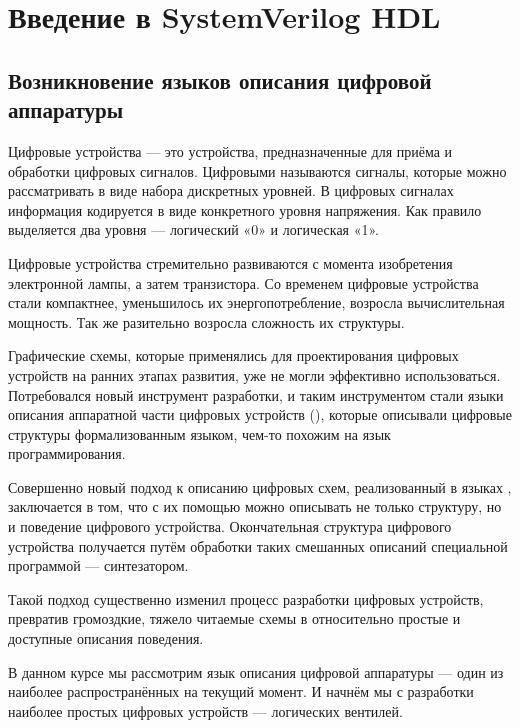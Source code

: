 \chapter{Введение в SystemVerilog HDL} 
\section{Возникновение языков описания цифровой аппаратуры}

\par{Цифровые устройства — это устройства, предназначенные для приёма и обработки цифровых сигналов. Цифровыми называются сигналы, которые можно рассматривать в виде набора дискретных уровней. В цифровых сигналах информация кодируется в виде конкретного уровня напряжения. Как правило выделяется два уровня — логический «0» и логическая «1».}

\par{Цифровые устройства стремительно развиваются с момента изобретения электронной лампы, а затем транзистора. Со временем цифровые устройства стали компактнее, уменьшилось их энергопотребление, возросла вычислительная мощность. Так же разительно возросла сложность их структуры.}

\par{Графические схемы, которые применялись для проектирования цифровых устройств на ранних этапах развития, уже не могли эффективно использоваться. Потребовался новый инструмент разработки, и таким инструментом стали языки описания аппаратной части цифровых устройств (), которые описывали цифровые структуры формализованным языком, чем-то похожим на язык программирования.}

\par{Совершенно новый подход к описанию цифровых схем, реализованный в языках , заключается в том, что с их помощью можно описывать не только структуру, но и поведение цифрового устройства. Окончательная структура цифрового устройства получается путём обработки таких смешанных описаний специальной программой — синтезатором.}

\par{Такой подход существенно изменил процесс разработки цифровых устройств, превратив громоздкие, тяжело читаемые схемы в относительно простые и доступные описания поведения.}

\par{В данном курсе мы рассмотрим язык описания цифровой аппаратуры  — один из наиболее распространённых на текущий момент. И начнём мы с разработки наиболее простых цифровых устройств — логических вентилей.}

